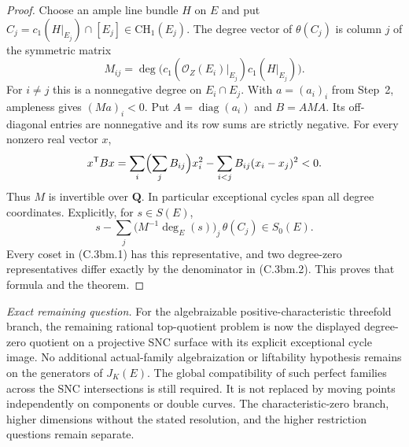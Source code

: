 \begin{proof}
Choose an ample line bundle $H$ on $E$ and put
$C_j=c_1(H|_{E_j})\cap[E_j]\in\mathrm{CH}_1(E_j)$.
The degree vector of $\theta(C_j)$ is column $j$ of the symmetric
matrix
\[
       M_{ij}=\deg\bigl(c_1(\mathcal O_Z(E_i)|_{E_j})
                                  c_1(H|_{E_j})\bigr).
\]
For $i\ne j$ this is a nonnegative degree on $E_i\cap E_j$.
With $a=(a_i)_i$ from Step~2, ampleness gives $(Ma)_i<0$.
Put $A=\operatorname{diag}(a_i)$ and $B=AMA$. Its off-diagonal
entries are nonnegative and its row sums are strictly negative.
For every nonzero real vector $x$,
\[
 x^{\mathsf T}Bx
   =\sum_i\Bigl(\sum_jB_{ij}\Bigr)x_i^2
       -\sum_{i<j}B_{ij}(x_i-x_j)^2<0.
\]
Thus $M$ is invertible over $\mathbf Q$. In particular exceptional
cycles span all degree coordinates. Explicitly, for $s\in S(E)$,
\[
 s-\sum_j\bigl(M^{-1}\deg_E(s)\bigr)_j\,\theta(C_j)\in S_0(E).
\]
Every coset in (C.3bm.1) has this representative, and two
degree-zero representatives differ exactly by the denominator
in (C.3bm.2). This proves that formula and the theorem.
\end{proof}

\emph{Exact remaining question.}
For the algebraizable positive-characteristic threefold branch,
the remaining rational top-quotient problem is now the displayed
degree-zero quotient on a projective SNC surface with its explicit
exceptional cycle image. No additional actual-family algebraization
or liftability hypothesis remains on the generators of $J_K(E)$.
The global compatibility of such perfect families across the SNC
intersections is still required. It is not replaced by moving
points independently on components or double curves. The
characteristic-zero branch, higher dimensions without the stated
resolution, and the higher restriction questions remain separate.
